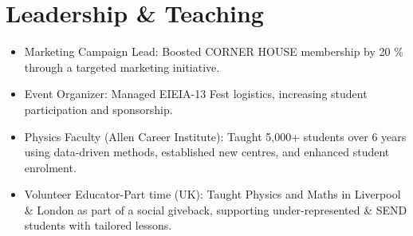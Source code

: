 \documentclass[a4paper,9pt]{article} %
\begin{document}







\section*{Leadership \& Teaching}

\begin{itemize}[left=0pt, itemsep=0pt] \item Marketing Campaign Lead: Boosted CORNER HOUSE membership by 20 \% through a targeted marketing initiative. \item Event Organizer: Managed EIEIA-13 Fest logistics, increasing student participation and sponsorship. \item Physics Faculty (Allen Career Institute): Taught 5,000+ students over 6 years using data-driven methods, established new centres, and enhanced student enrolment. \item Volunteer Educator-Part time (UK): Taught Physics and Maths in Liverpool \& London as part of a social giveback, supporting under-represented \& SEND students with tailored lessons. \end{itemize}
\end{document}
